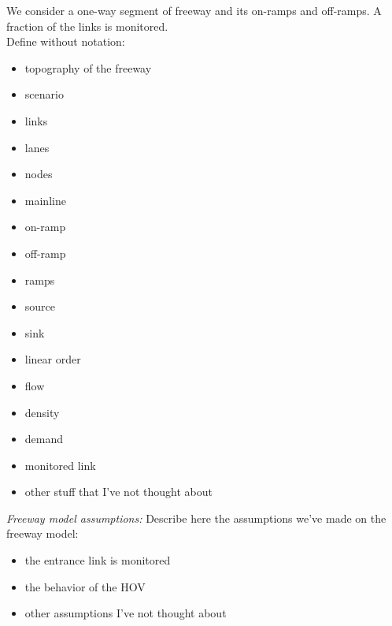 We consider a one-way segment of freeway and its on-ramps and off-ramps.
A fraction of the links is monitored.\\
Define without notation:
\begin{itemize}
	\item topography of the freeway
	\item scenario
	\item links
	\item lanes
	\item nodes
	\item mainline
	\item on-ramp
	\item off-ramp
	\item ramps
	\item source
	\item sink
	\item linear order
	\item flow
	\item density
	\item demand
	\item monitored link
	\item other stuff that I've not thought about
\end{itemize}
\emph{Freeway model assumptions:} \color{red}Describe here the assumptions we've made on the freeway model:\color{black}
\begin{itemize}
	\item the entrance link is monitored
	\item the behavior of the HOV
	\item other assumptions I've not thought about
\end{itemize}

